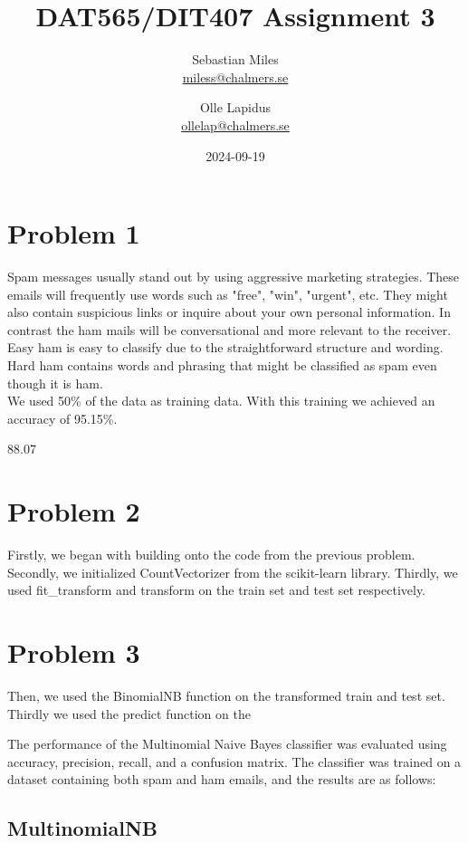 \documentclass[a4paper]{article}
\begin{document}
\author{
  Sebastian Miles \\
  \href{mailto:miless@chalmers.se}{miless@chalmers.se}
  \and
  Olle Lapidus \\
  \href{mailto:ollelap@chalmers.se}{ollelap@chalmers.se}
}
\title{DAT565/DIT407 Assignment 3}
\date{2024-09-19}

\maketitle
\section*{Problem 1}
Spam messages usually stand out by using aggressive marketing strategies. These emails will frequently use words such as "free", "win", "urgent", etc. They might also contain suspicious links or inquire about your own personal information. In contrast the ham mails will be conversational and more relevant to the receiver. Easy ham is easy to classify due to the straightforward structure and wording. Hard ham contains words and phrasing that might be classified as spam even though it is ham.\\
We used 50\% of the data as training data. With this training we achieved an accuracy of 95.15\%.

88.07


\section*{Problem 2}
Firstly, we began with building onto the code from the previous problem. Secondly, we initialized CountVectorizer from the scikit-learn library. Thirdly, we used fit\_transform and transform on the train set and test set respectively. 

\section*{Problem 3}
Then, we used the BinomialNB function on the transformed train and test set. Thirdly we used the predict function on the 

The performance of the Multinomial Naive Bayes classifier was evaluated using accuracy, precision, recall, and a confusion matrix. The classifier was trained on a dataset containing both spam and ham emails, and the results are as follows:

\subsection*{MultinomialNB}
\end{document}
